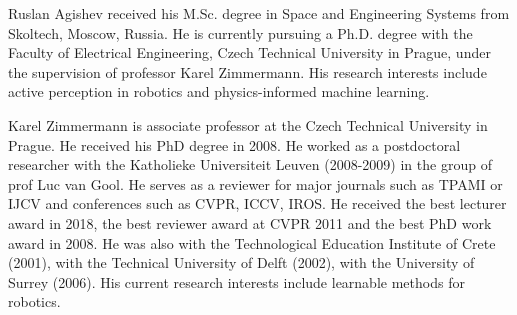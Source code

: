 \begin{IEEEbiography}{Ruslan Agishev}
    received his M.Sc. degree in Space and Engineering Systems from Skoltech, Moscow, Russia.
    He is currently pursuing a Ph.D. degree with the Faculty of Electrical Engineering, Czech Technical University in Prague,
    under the supervision of professor Karel Zimmermann.
    His research interests include active perception in robotics and physics-informed machine learning.
\end{IEEEbiography}

\begin{IEEEbiography}{Karel Zimmermann}
    is associate professor at the Czech Technical University in Prague.
    He received his PhD degree in 2008.
    He worked as a postdoctoral researcher with the Katholieke Universiteit Leuven (2008-2009) in the group of prof Luc van Gool.
    He serves as a reviewer for major journals such as TPAMI or IJCV and conferences such as CVPR, ICCV, IROS.
    He received the best lecturer award in 2018, the best reviewer award at CVPR 2011 and the best PhD work award in 2008.
    He was also with the Technological Education Institute of Crete (2001), with the Technical University of Delft (2002), with the
    University of Surrey (2006).
    His current research interests include learnable methods for robotics.
\end{IEEEbiography}